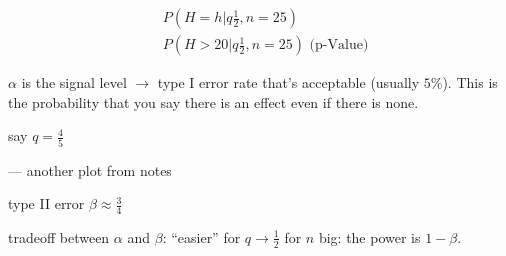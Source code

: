 \begin{align*}
&P\left(H=h |q\frac{1}{2},n=25\right) \\
&P\left(H>20 |q\frac{1}{2},n=25\right) \mbox{ (p-Value)}
\end{align*}

$\alpha$ is the signal level $\rightarrow$ type I error rate that's acceptable (usually $5\%$). This is the probability that you say there is an effect even if there is none.

say $q = \frac{4}{5}$

--- another plot from notes

type II error $\beta \approx \frac{3}{4}$

tradeoff between $\alpha$ and $\beta$: ``easier'' for $q \rightarrow \frac{1}{2}$ for $n$ big: the power is $1-\beta$.